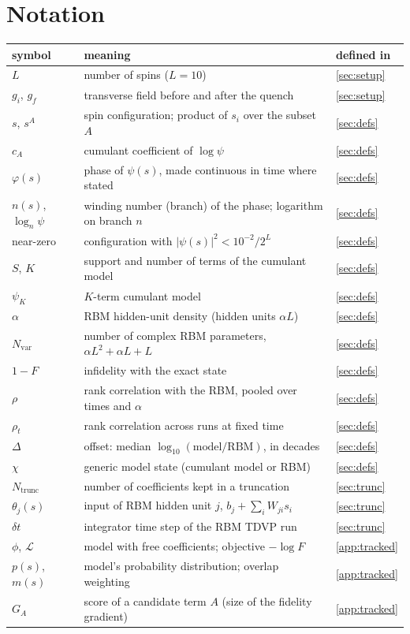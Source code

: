 \documentclass[11pt,a4paper]{article}
\begin{document}
\section{Notation}\label{app:notation}
\begin{center}
\small
\begin{tabular}{lll}
  \toprule
  symbol & meaning & defined in \\
  \midrule
  $L$ & number of spins ($L=10$) & \cref{sec:setup} \\
  $g_i$, $g_f$ & transverse field before and after the quench & \cref{sec:setup} \\
  $s$, $s^A$ & spin configuration; product of $s_i$ over the subset $A$ & \cref{sec:defs} \\
  $c_A$ & cumulant coefficient of $\log\psi$ & \cref{sec:defs} \\
  $\varphi(s)$ & phase of $\psi(s)$, made continuous in time where stated & \cref{sec:defs} \\
  $n(s)$, $\log_n\psi$ & winding number (branch) of the phase; logarithm on branch $n$ & \cref{sec:defs} \\
  near-zero & configuration with $|\psi(s)|^2<10^{-2}/2^L$ & \cref{sec:defs} \\
  $S$, $K$ & support and number of terms of the cumulant model & \cref{sec:defs} \\
  $\psi_K$ & $K$-term cumulant model & \cref{sec:defs} \\
  $\alpha$ & RBM hidden-unit density (hidden units $\alpha L$) & \cref{sec:defs} \\
  $N_\mathrm{var}$ & number of complex RBM parameters, $\alpha L^2+\alpha L+L$ & \cref{sec:defs} \\
  $1-F$ & infidelity with the exact state & \cref{sec:defs} \\
  $\rho$ & rank correlation with the RBM, pooled over times and $\alpha$ & \cref{sec:defs} \\
  $\rho_t$ & rank correlation across runs at fixed time & \cref{sec:defs} \\
  $\Delta$ & offset: median $\log_{10}(\text{model}/\text{RBM})$, in decades & \cref{sec:defs} \\
  $\chi$ & generic model state (cumulant model or RBM) & \cref{sec:defs} \\
  $N_\mathrm{trunc}$ & number of coefficients kept in a truncation & \cref{sec:trunc} \\
  $\theta_j(s)$ & input of RBM hidden unit $j$, $b_j+\sum_iW_{ji}s_i$ & \cref{sec:trunc} \\
  $\delta t$ & integrator time step of the RBM TDVP run & \cref{sec:trunc} \\
  $\phi$, $\mathcal{L}$ & model with free coefficients; objective $-\log F$ & \cref{app:tracked} \\
  $p(s)$, $m(s)$ & model's probability distribution; overlap weighting & \cref{app:tracked} \\
  $G_A$ & score of a candidate term $A$ (size of the fidelity gradient) & \cref{app:tracked} \\
  \bottomrule
\end{tabular}
\end{center}
\end{document}
